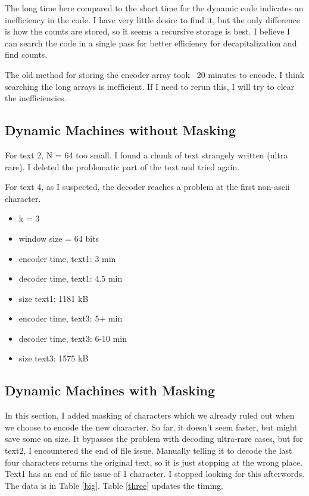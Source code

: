 \documentclass{article}
\begin{document}
The long time here compared to the short time for the dynamic code indicates an inefficiency in the code. I have very little desire to find it, but the only difference is how the counts are stored, so it seems a recursive storage is best. I believe I can search the code in a single pass for better efficiency for decapitalization and find counts.

The old method for storing the encoder array took ~20 minutes to encode. I think searching the long arrays is inefficient. If I need to rerun this, I will try to clear the inefficiencies.


\subsection{Dynamic Machines without Masking}

For text 2, N = 64 too small. I found a chunk of text strangely written (ultra rare). I deleted the problematic part of the text and tried again.

For text 4, as I suspected, the decoder reaches a problem at the first non-ascii character.


\begin{itemize}
\item k = 3
\item window size = 64 bits
\item encoder time, text1: 3 min
\item decoder time, text1: 4.5 min
\item size text1: 1181 kB
\item encoder time, text3: 5+ min
\item decoder time, text3: 6-10 min
\item size text3: 1575 kB
\end{itemize}



\subsection{Dynamic Machines with Masking}

In this section, I added masking of characters which we already ruled out when we choose to encode the new character. So far, it doesn't seem faster, but might save some on size. It bypasses the problem with decoding ultra-rare cases, but for text2, I encountered the end of file issue. Manually telling it to decode the last four characters returns the original text, so it is just stopping at the wrong place. Text1 has an end of file issue of 1 character. I stopped looking for this afterwords. The data is in Table \ref{big}. Table \ref{three} updates the timing.
\end{document}
